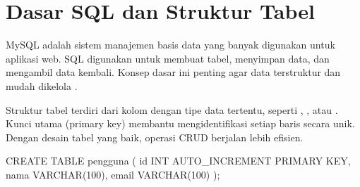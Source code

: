 \section{Dasar SQL dan Struktur Tabel}
MySQL adalah sistem manajemen basis data yang banyak digunakan untuk aplikasi web. SQL digunakan untuk membuat tabel, menyimpan data, dan mengambil data kembali. Konsep dasar ini penting agar data terstruktur dan mudah dikelola \cite{mysqlDocs}.

Struktur tabel terdiri dari kolom dengan tipe data tertentu, seperti , , atau . Kunci utama (primary key) membantu mengidentifikasi setiap baris secara unik. Dengan desain tabel yang baik, operasi CRUD berjalan lebih efisien.

\begin{webcode}[language=SQL, caption={Membuat Tabel Sederhana}]
CREATE TABLE pengguna (
  id INT AUTO_INCREMENT PRIMARY KEY,
  nama VARCHAR(100),
  email VARCHAR(100)
);
\end{webcode}

